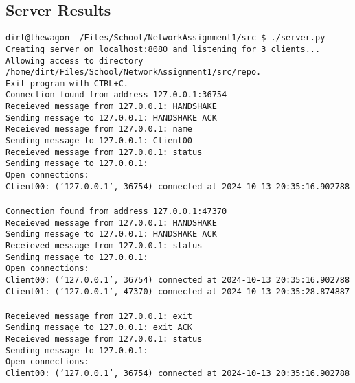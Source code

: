 \documentclass{article}
\begin{document}
\subsection{Server Results}
\texttt{dirt@thewagon ~/Files/School/NetworkAssignment1/src \$ ./server.py\\
Creating server on localhost:8080 and listening for 3 clients...\\
Allowing access to directory /home/dirt/Files/School/NetworkAssignment1/src/repo.\\
Exit program with CTRL+C.\\
Connection found from address 127.0.0.1:36754\\
Receieved message from 127.0.0.1: HANDSHAKE\\
Sending message to 127.0.0.1: HANDSHAKE ACK\\
Receieved message from 127.0.0.1: name\\
Sending message to 127.0.0.1: Client00\\
Receieved message from 127.0.0.1: status\\
Sending message to 127.0.0.1: \\
Open connections:\\
Client00: ('127.0.0.1', 36754) connected at 2024-10-13 20:35:16.902788\\
\\
Connection found from address 127.0.0.1:47370\\
Receieved message from 127.0.0.1: HANDSHAKE\\
Sending message to 127.0.0.1: HANDSHAKE ACK\\
Receieved message from 127.0.0.1: status\\
Sending message to 127.0.0.1: \\
Open connections:\\
Client00: ('127.0.0.1', 36754) connected at 2024-10-13 20:35:16.902788\\
Client01: ('127.0.0.1', 47370) connected at 2024-10-13 20:35:28.874887\\
\\
Receieved message from 127.0.0.1: exit\\
Sending message to 127.0.0.1: exit ACK\\
Receieved message from 127.0.0.1: status\\
Sending message to 127.0.0.1: \\
Open connections:\\
Client00: ('127.0.0.1', 36754) connected at 2024-10-13 20:35:16.902788\\
}
\end{document}
